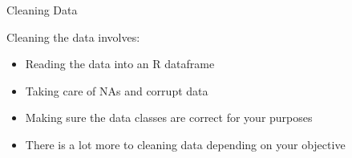 \documentclass{beamer}
\begin{document}
\begin{frame}{
	\begin{minipage}[t]{0.75\textwidth}
		Cleaning Data
	\end{minipage}
	\hfill
	\begin{minipage}[t]{0.25\textwidth}
		\flushright
	\end{minipage}
}{}
Cleaning the data involves:
\begin{itemize}
	\item Reading the data into an R dataframe
	\item Taking care of NAs and corrupt data
	\item Making sure the data classes are correct for your purposes
	\item There is a lot more to cleaning data depending on your objective
\end{itemize}

\end{frame}
\end{document}
